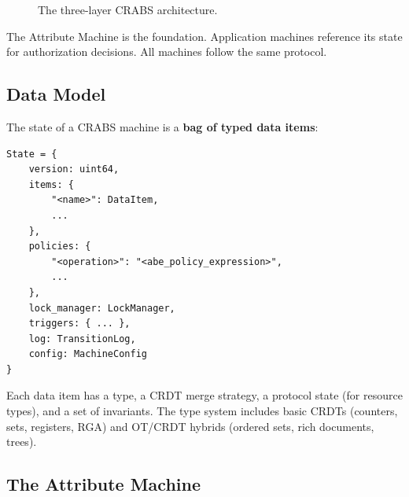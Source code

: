 \documentclass[11pt,a4paper]{article}
\begin{document}
\begin{figure}[H]
\centering
{}
\caption{The three-layer CRABS architecture.}
\label{fig:architecture}
\end{figure}

The Attribute Machine is the foundation. Application machines reference its state for authorization decisions. All machines follow the same protocol.

\subsection{Data Model}

The state of a CRABS machine is a \textbf{bag of typed data items}:

\begin{lstlisting}
State = {
    version: uint64,
    items: {
        "<name>": DataItem,
        ...
    },
    policies: {
        "<operation>": "<abe_policy_expression>",
        ...
    },
    lock_manager: LockManager,
    triggers: { ... },
    log: TransitionLog,
    config: MachineConfig
}
\end{lstlisting}

Each data item has a type, a CRDT merge strategy, a protocol state (for resource types), and a set of invariants. The type system includes basic CRDTs (counters, sets, registers, RGA) and OT/CRDT hybrids (ordered sets, rich documents, trees).

\subsection{The Attribute Machine}
\end{document}
